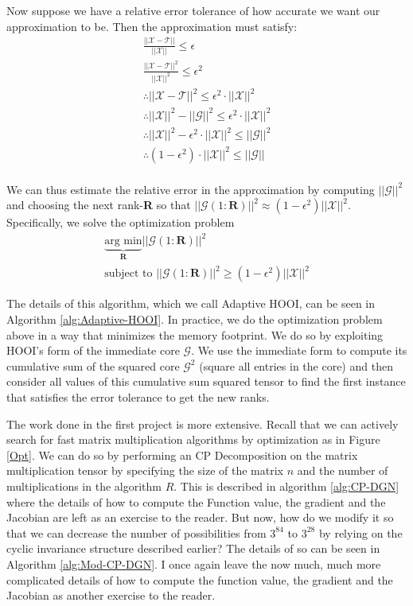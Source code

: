 \documentclass[MS]{wfuthesis}
\begin{document}
        Now suppose we have a relative error tolerance of how accurate we want our approximation to be. Then the approximation must satisfy:
        \begin{eqnarray*}
            \frac{||\mathcal{X - T}||}{||\mathcal{X}||} \leq \epsilon \\
            \frac{||\mathcal{X - T}||^2}{||\mathcal{X}||^2} \leq \epsilon^2 \\
            \therefore ||\mathcal{X - T}||^2 \leq \epsilon^2 \cdot ||\mathcal{X}||^2 \\
            \therefore ||\mathcal{X}||^2 - ||\mathcal{G}||^2 \leq \epsilon^2 \cdot ||\mathcal{X}||^2 \\
            \therefore ||\mathcal{X}||^2 - \epsilon^2 \cdot ||\mathcal{X}||^2 \leq ||\mathcal{G}||^2 \\
            \therefore (1 - \epsilon^2) \cdot ||\mathcal{X}||^2 \leq ||\mathcal{G}|| \\
        \end{eqnarray*}

        We can thus estimate the relative error in the approximation by computing $||\mathcal{G}||^2$ and choosing the next rank-\textbf{R} so that $||\mathcal{G}(1:\textbf{R}) ||^2 \approx (1 - \epsilon^2)||\mathcal{X}||^2$. Specifically, we solve the optimization problem
        \begin{eqnarray*}
            \underbrace{\text{arg min}}_\textbf{R} ||\mathcal{G}(1:\textbf{R})||^2 \\
            \text{subject to } ||\mathcal{G}(1:\textbf{R}) ||^2 \geq (1 - \epsilon^2)||\mathcal{X}||^2
        \end{eqnarray*}

        The details of this algorithm, which we call Adaptive HOOI, can be seen in Algorithm \ref{alg:Adaptive-HOOI}. In practice, we do the optimization problem above in a way that minimizes the memory footprint. We do so by exploiting HOOI's form of the immediate core $\mathcal{G}$. We use the immediate form to compute its cumulative sum of the squared core $\mathcal{G}^2$ (square all entries in the core) and then consider all values of this cumulative sum squared tensor to find the first instance that satisfies the error tolerance to get the new ranks.

        The work done in the first project is more extensive. Recall that we can actively search for fast matrix multiplication algorithms by optimization as in Figure \ref{Opt}. We can do so by performing an CP Decomposition on the matrix multiplication tensor by specifying the size of the matrix $n$ and the number of multiplications in the algorithm $R$. This is described in algorithm \ref{alg:CP-DGN} where the details of how to compute the Function value, the gradient and the Jacobian are left as an exercise to the reader. But now, how do we modify it so that we can decrease the number of possibilities from $3^{84}$ to $3^{28}$ by relying on the cyclic invariance structure described earlier? The details of so can be seen in Algorithm \ref{alg:Mod-CP-DGN}. I once again leave the now much, much more complicated details of how to compute the function value, the gradient and the Jacobian as another exercise to the reader. 
        
\end{document}
